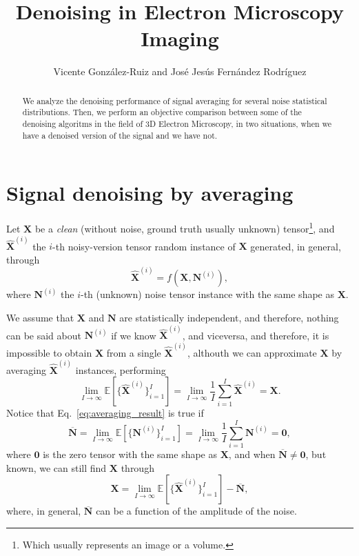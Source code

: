 \documentclass{article}
\title{Denoising in Electron Microscopy Imaging}
\author{Vicente González-Ruiz and José Jesús Fernández Rodríguez}
\begin{document}
\maketitle

\begin{abstract}
  We analyze the denoising performance of signal averaging for several
  noise statistical distributions. Then, we perform an objective
  comparison between some of the denoising algoritms in the field
  of 3D Electron Microscopy, in two situations, when we have a
  denoised version of the signal and we have not.
\end{abstract}

\section{Signal denoising by averaging}
Let $\mathbf{X}$ be a \emph{clean} (without noise, ground truth
usually unknown) tensor\footnote{Which usually represents an image or
  a volume.}, and $\hat{\mathbf X}^{(i)}$ the $i$-th noisy-version
tensor random instance of $\mathbf{X}$ generated, in general, through
\begin{equation}
  \hat{\mathbf X}^{(i)} = f(\mathbf{X}, \mathbf{N}^{(i)}),
\end{equation}
where ${\mathbf N}^{(i)}$ the $i$-th (unknown) noise tensor instance
with the same shape as $\mathbf{X}$.

We assume that ${\mathbf X}$ and $\mathbf{N}$ are statistically
independent, and therefore, nothing can be said about
${\mathbf N}^{(i)}$ if we know $\hat{\mathbf X}^{(i)}$, and
viceversa, and therefore, it is impossible to obtain ${\mathbf X}$
from a single $\hat{\mathbf X}^{(i)}$, althouth we can approximate ${\mathbf X}$ by
averaging $\hat{\mathbf X}^{(i)}$ instances, performing
\begin{equation}
  \lim_{I \to \infty} \mathbb{E}\left[\{\hat{\mathbf X}^{(i)}\}_{i=1}^I\right] = \lim_{I \to \infty} \frac{1}{I} \sum_{i=1}^I \hat{\mathbf X}^{(i)} = {\mathbf X}.
  \label{eq:averaging_result}
\end{equation}
Notice that Eq.~\ref{eq:averaging_result} is true if 
\begin{equation}
  \overline{\mathbf N} = \lim_{I \to \infty}{\mathbb E}[\{{\mathbf N^{(i)}}\}_{i=1}^I]=\lim_{I \to \infty}\frac{1}{I} \sum_{i=1}^I {\mathbf N}^{(i)}={\mathbf 0},
  \label{eq:noise_expectation_2}
\end{equation}
where ${\mathbf 0}$ is the zero tensor with the same shape as $\mathbf{X}$, and when $\overline{\mathbf N}\ne {\mathbf 0}$, but known, we can still find ${\mathbf X}$ through
\begin{equation}
  {\mathbf X} = \lim_{I \to \infty} \mathbb{E}\left[\{\hat{\mathbf X}^{(i)}\}_{i=1}^I\right]  - \overline{\mathbf N},
  \label{eq:averaging_result_with_bias}
\end{equation}
where, in general, $\overline{\mathbf N}$ can be a function of the amplitude of the noise. 
\end{document}
